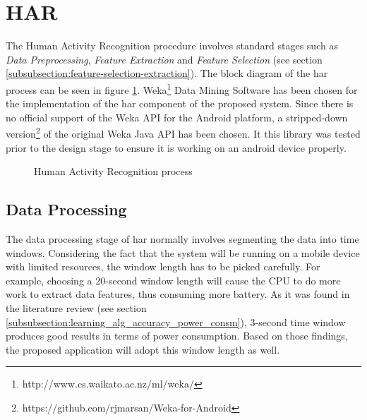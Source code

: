     \section{HAR}
    The Human Activity Recognition procedure involves standard stages such as \textit{Data Preprocessing}, \textit{Feature Extraction} and \textit{Feature Selection} (see section \ref{subsubsection:feature-selection-extraction}). The block diagram of the \gls{har} process can be seen in figure \ref{fig:har_process}. Weka\footnote{http://www.cs.waikato.ac.nz/ml/weka/} Data Mining Software has been chosen for the implementation of the \gls{har} component of the proposed system. Since there is no official support of the Weka API for the Android platform, a stripped-down version\footnote{https://github.com/rjmarsan/Weka-for-Android} of the original Weka Java API has been chosen. It this library was tested prior to the design stage to ensure it is working on an android device properly. 
    
    \begin{figure}[H]
        \centering
        \caption{Human Activity Recognition process}
        \label{fig:har_process}
    \end{figure}
    
    \subsection{Data Processing}
    The data processing stage of \gls{har} normally involves segmenting the data into time windows. Considering the fact that the system will be running on a mobile device with limited resources, the window length has to be picked carefully. For example, choosing a 20-second window length will cause the CPU to do more work to extract data features, thus consuming more battery. As it was found in the literature review (see section \ref{subsubsection:learning_alg_accuracy_power_consm}), 3-second time window produces good results in terms of power consumption. Based on those findings, the proposed application will adopt this window length as well.
    

